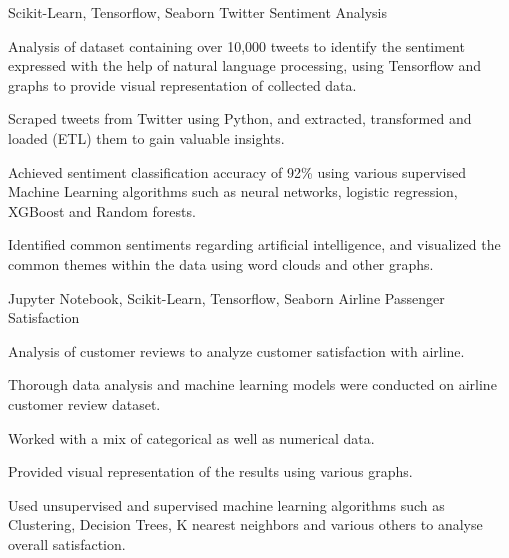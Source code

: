 \begin{cventries}
\cventry
{Scikit-Learn, Tensorflow, Seaborn} %
{Twitter Sentiment Analysis} %
{}
{}
{
	\begin{cvitems} %
	\item Analysis of dataset containing over 10,000 tweets to identify the sentiment expressed with the help of natural language processing, using Tensorflow and graphs to provide visual representation of collected data.
	\item Scraped tweets from Twitter using Python, and extracted, transformed and loaded (ETL) them to gain valuable insights.
	\item Achieved sentiment classification accuracy of 92\% using various supervised Machine Learning algorithms such as neural networks, logistic regression, XGBoost and Random forests.
	\item Identified common sentiments regarding artificial intelligence, and visualized the common themes within the data using word clouds and other graphs.
	\end{cvitems}
}

\cventry
{Jupyter Notebook, Scikit-Learn, Tensorflow, Seaborn} %
{Airline Passenger Satisfaction} %
{}
{}
{
	\begin{cvitems} %
		\item Analysis of customer reviews to analyze customer satisfaction with airline.
		\item Thorough data analysis and machine learning models were conducted on airline customer review dataset.
		\item Worked with a mix of categorical as well as numerical data.
		\item Provided visual representation of the results using various graphs.
        \item Used unsupervised and supervised machine learning algorithms such as Clustering, Decision Trees, K nearest neighbors and various others to analyse overall satisfaction.
	\end{cvitems}
}


\end{cventries}
